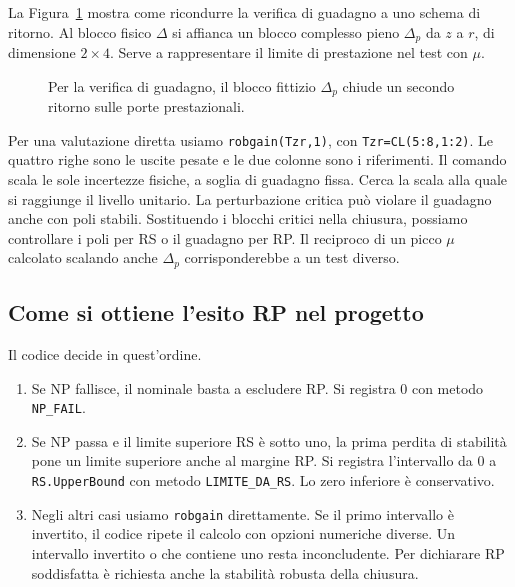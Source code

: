 La Figura~\ref{fig:cap9-rp} mostra come ricondurre la verifica
di guadagno a uno schema di ritorno. Al blocco fisico $\Delta$
si affianca un blocco complesso pieno $\Delta_p$ da $z$ a $r$,
di dimensione $2\times4$. Serve a rappresentare il limite di
prestazione nel test con $\mu$.

\begin{figure}[!htb]\centering
\begingroup\newcommand{\SeaDeltaLabel}{struttura A oppure B}%
\resizebox{.59\linewidth}{!}{}\endgroup
\caption{Per la verifica di guadagno, il blocco fittizio $\Delta_p$
chiude un secondo ritorno sulle porte prestazionali.}
\label{fig:cap9-rp}
\end{figure}

Per una valutazione diretta usiamo \texttt{robgain(Tzr,1)}, con
\texttt{Tzr=CL(5:8,1:2)}. Le quattro righe sono le uscite pesate
e le due colonne sono i riferimenti. Il comando scala le sole
incertezze fisiche, a soglia di guadagno fissa. Cerca la scala alla
quale si raggiunge il livello unitario. La perturbazione critica può
violare il guadagno anche con poli stabili. Sostituendo i blocchi
critici nella chiusura, possiamo controllare i poli per RS o il
guadagno per RP. Il reciproco di un picco $\mu$ calcolato scalando
anche $\Delta_p$ corrisponderebbe a un test diverso.

\subsection{Come si ottiene l'esito RP nel progetto}

Il codice decide in quest'ordine.

\begin{enumerate}
 \item Se NP fallisce, il nominale basta a escludere RP. Si registra
 $0$ con metodo \texttt{NP\_FAIL}.
 \item Se NP passa e il limite superiore RS è sotto uno, la prima
 perdita di stabilità pone un limite superiore anche al margine RP.
 Si registra l'intervallo da $0$ a \texttt{RS.UpperBound} con metodo
 \texttt{LIMITE\_DA\_RS}. Lo zero inferiore è conservativo.
 \item Negli altri casi usiamo \texttt{robgain} direttamente.
 Se il primo intervallo è invertito, il codice ripete il calcolo
 con opzioni numeriche diverse. Un intervallo invertito o che
 contiene uno resta inconcludente. Per dichiarare RP soddisfatta
 è richiesta anche la stabilità robusta della chiusura.
\end{enumerate}

